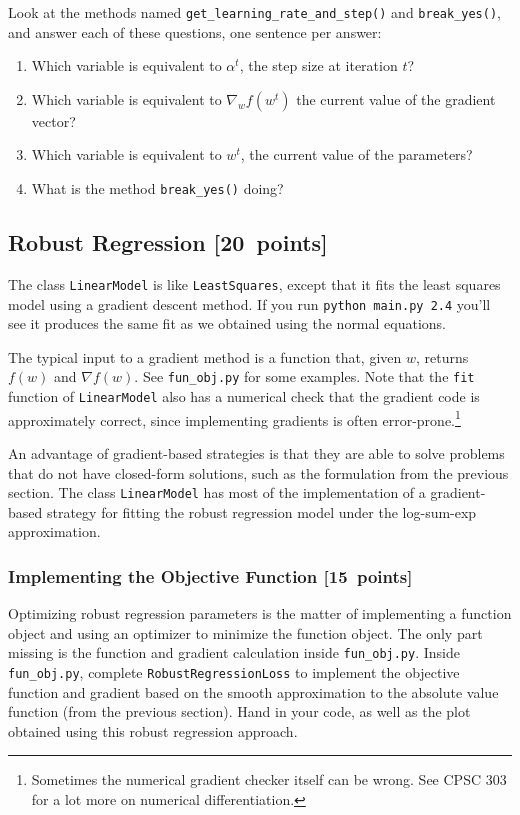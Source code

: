 \documentclass{article}
\newcommand{\blu}[1]{{\textcolor{blu}{#1}}}
\let\ask\blu
\newcommand\pts[1]{\textcolor{pointscolour}{[#1~points]}}
\begin{document}
Look at the methods named \texttt{get\_learning\_rate\_and\_step()} and \texttt{break\_yes()}, and \ask{answer each of these questions, one sentence per answer:}
\begin{enumerate}
	\item Which variable is equivalent to $\alpha^t$, the step size at iteration $t$?
	\item Which variable is equivalent to $\nabla_w f(w^t)$ the current value of the gradient vector?
	\item Which variable is equivalent to $w^t$, the current value of the parameters?
	\item What is the method \texttt{break\_yes()} doing?
\end{enumerate}


\subsection{Robust Regression \pts{20}}

The class \texttt{LinearModel} is like \texttt{LeastSquares}, except that it fits the least squares model using a gradient descent method. If you run \verb|python main.py 2.4| you'll see it produces the same fit as we obtained using the normal equations.

The typical input to a gradient method is a function that, given $w$, returns $f(w)$ and $\nabla f(w)$. See \texttt{fun\_obj.py} for some examples. Note that the \texttt{fit} function of \texttt{LinearModel} also has a numerical check that the gradient code is approximately correct, since implementing gradients is often error-prone.\footnote{Sometimes the numerical gradient checker itself can be wrong. See CPSC 303 for a lot more on numerical differentiation.}

An advantage of gradient-based strategies is that they are able to solve
problems that do not have closed-form solutions, such as the formulation from the
previous section. The class \texttt{LinearModel} has most of the implementation
of a gradient-based strategy for fitting the robust regression model under the log-sum-exp approximation.

\subsubsection{Implementing the Objective Function \pts{15}}

Optimizing robust regression parameters is the matter of implementing a function object and using an optimizer to minimize the function object. The only part missing is the function and gradient calculation inside \texttt{fun\_obj.py}.
\ask{Inside \texttt{fun\_obj.py}, complete \texttt{RobustRegressionLoss} to implement the objective function and gradient based on the smooth
approximation to the absolute value function (from the previous section). Hand in your code, as well
as the plot obtained using this robust regression approach.}
\end{document}
